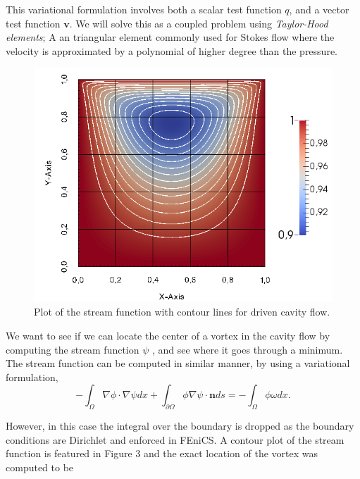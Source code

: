 \documentclass[11pt,a4paper,english]{article}
\numberwithin{equation}{section}
\begin{document}
This variational formulation involves both a scalar test function $q$, and a vector test function $\mathbf{v}$. We will solve this as a coupled problem using \emph{Taylor-Hood elements}; A an triangular element commonly used for Stokes flow where the velocity is approximated by a polynomial of higher degree than the pressure. 

\vspace{1.5cm}
\begin{figure}[h!]
\begin{center}
  \includegraphics[scale=0.5]{psi_square.png}
  \end{center}
  \caption{Plot of the stream function with contour lines for driven cavity flow.}
\end{figure}

We want to see if we can locate the center of a vortex in the cavity flow by computing the stream function $\psi$ , and see where it goes through a minimum. The stream function can be computed in similar manner, by using a variational formulation,  
\begin{equation}
-\int_\Omega \nabla \phi \cdot \nabla \psi dx + \int_{\partial \Omega} \phi \nabla \psi \cdot \mathbf{n} ds = - \int_\Omega \phi \omega dx.
\end{equation}

However, in this case the integral over the boundary is dropped as the boundary conditions are Dirichlet and enforced in FEniCS.
A contour plot of the stream function is featured in Figure 3 and the exact location of the vortex was computed to be 
\end{document}
